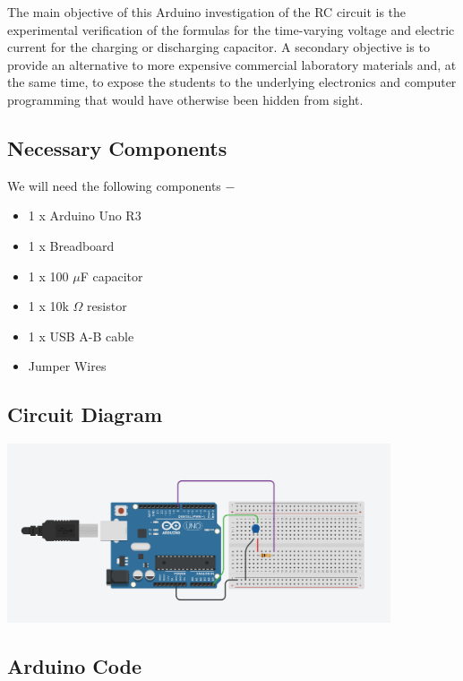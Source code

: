 The main objective of this Arduino investigation of the RC circuit is the experimental verification of the formulas for the time-varying voltage and electric current for the charging or discharging capacitor. A secondary objective is to provide an alternative to more expensive commercial laboratory materials and, at the same time, to expose the students to the underlying electronics and computer programming that would have otherwise been hidden from sight.

\subsection{Necessary Components}
We will need the following components −
\begin{itemize}
\item 1 x Arduino Uno R3
\item 1 x Breadboard
\item 1 x 100 $\mu$F capacitor
\item 1 x 10k $\Omega$ resistor
\item 1 x USB A-B cable
\item Jumper Wires
\end{itemize}

\subsection{Circuit Diagram}
            \begin{center}
            \includegraphics[width =0.85\textwidth]{images/RC_charging_discharging_circuit.png}
            \end{center}


\subsection{Arduino Code}

